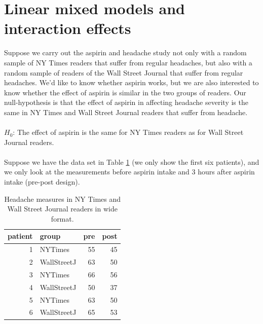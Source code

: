 \documentclass[]{book}\usepackage[]{graphicx}\usepackage[]{color}
\begin{document}
%         
% 
% 



\section{Linear mixed models and interaction effects}


Suppose we carry out the aspirin and headache study not only with a random sample of NY Times readers that suffer from regular headaches, but also with a random sample of readers of the Wall Street Journal that suffer from regular headaches. We'd like to know whether aspirin works, but we are also interested to know whether the effect of aspirin is similar in the two groups of readers. Our null-hypothesis is that the effect of aspirin in affecting headache severity is the same in NY Times and Wall Street Journal readers that suffer from headache.\\
\\
$H_0$: The effect of aspirin is the same for NY Times readers as for Wall Street Journal readers.
\\
\\
Suppose we have the data set in Table \ref{tab:analysisprepostmixed1} (we only show the first six patients), and we only look at the measurements before aspirin intake and 3 hours after aspirin intake (pre-post design). 

\begin{table}[ht]
\centering
\caption{Headache measures in NY Times and Wall Street Journal readers in wide format.} 
\label{tab:analysisprepostmixed1}
\begin{tabular}{rlrr}
  \hline
patient & group & pre & post \\ 
  \hline
1 & NYTimes & 55 & 45 \\ 
  2 & WallStreetJ & 63 & 50 \\ 
  3 & NYTimes & 66 & 56 \\ 
  4 & WallStreetJ & 50 & 37 \\ 
  5 & NYTimes & 63 & 50 \\ 
  6 & WallStreetJ & 65 & 53 \\ 
   \hline
\end{tabular}
\end{table}
\end{document}
